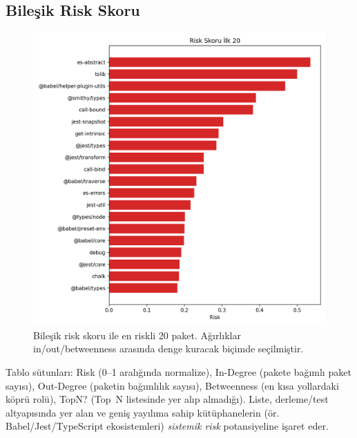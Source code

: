 \documentclass[11pt,a4paper]{article}
\begin{document}
\subsection{Bileşik Risk Skoru}
\begin{figure}[H]
  \centering
  \includegraphics{top20_risk.png}
  \caption{Bileşik risk skoru ile en riskli 20 paket. Ağırlıklar in/out/betweenness arasında denge kuracak biçimde seçilmiştir.}
\end{figure}

\noindent Tablo sütunları: Risk (0--1 aralığında normalize), In-Degree (pakete bağımlı paket sayısı), Out-Degree (paketin bağımlılık sayısı), Betweenness (en kısa yollardaki köprü rolü), TopN? (Top~N listesinde yer alıp almadığı). Liste, derleme/test altyapısında yer alan ve geniş yayılıma sahip kütüphanelerin (ör. Babel/Jest/TypeScript ekosistemleri) \emph{sistemik risk} potansiyeline işaret eder.
\end{document}
